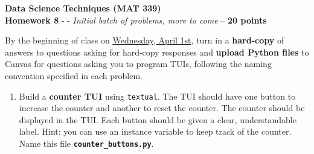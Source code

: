 \documentclass[12pt]{article}
\begin{document}
	
\begin{center}
	\textbf{Data Science Techniques (MAT 339)} \\
	\textbf{Homework 8} - - \textit{Initial batch of problems, more to come} -- \textbf{20 points}\\
\end{center}
By the beginning of class on \underline{Wednesday, April 1st}, turn in a \textbf{hard-copy} of answers to questions asking for hard-copy responses and \textbf{upload Python files} to Canvas for questions asking you to program TUIs, following the naming convention specified in each problem. \\

\begin{enumerate}
		
	\item Build a \textbf{counter TUI} using \texttt{textual}. The TUI should have one button to increase the counter and another to reset the counter. The counter should be displayed in the TUI. Each button should be given a clear, understandable label. Hint: you can use an instance variable to keep track of the counter. Name this file \textbf{\texttt{counter\_buttons.py}}.
	

\end{enumerate}
\end{document}
